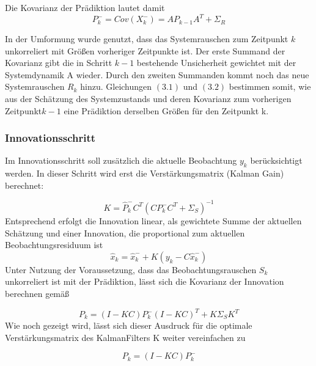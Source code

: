 Die Kovarianz der Prädiktion lautet damit
\begin{equation}
\tag{3.2}
{P}_{k}^{-}=Cov({X}_{k}^{-})=AP_{k-1}A^{T}+\Sigma_{R}
\end{equation}

In der Umformung wurde genutzt, dass das Systemrauschen zum Zeitpunkt $k$ unkorreliert mit
Größen vorheriger Zeitpunkte ist. Der erste Summand der Kovarianz gibt die in Schritt $k-1$ bestehende
Unsicherheit gewichtet mit der Systemdynamik A wieder. Durch den zweiten Summanden
kommt noch das neue Systemrauschen $R_{k}$ hinzu. Gleichungen $(3.1)$ und $(3.2)$ bestimmen somit, wie aus der Schätzung des Systemzustands und deren Kovarianz zum vorherigen Zeitpunkt$ k-1$ eine Prädiktion derselben Größen für den Zeitpunkt k.

\subsubsection{Innovationsschritt}
Im Innovationsschritt soll zusätzlich die aktuelle Beobachtung $y_{k}$ berücksichtigt werden. In dieser Schritt wird erst die Verstärkungsmatrix (Kalman Gain) berechnet:

\begin{equation}
\tag{3.3}
K=\widehat{P}_{k}^{-}C^{T}(CP_{k}^{-}C^{T}+\Sigma_{S})^{-1}
\end{equation}
Entsprechend erfolgt die Innovation linear, als gewichtete
Summe der aktuellen Schätzung und einer Innovation, die proportional zum aktuellen Beobachtungsresiduum ist
\begin{equation}
\tag{3.4}
\widehat{x}_{k}=\widehat{x}_{k}^{-}+K(y_{k}-C\widehat{x}_{k}^{-})
\end{equation}
Unter Nutzung der Voraussetzung, dass das Beobachtungsrauschen $S_{k}$ unkorreliert ist mit der Prädiktion, lässt sich die Kovarianz der Innovation berechnen gemäß

\begin{equation}
\tag{3.5}
P_{k}=(I-KC)P_{k}^{-}(I-KC)^{T}+K\Sigma_{S}K^{T}
\end{equation}
Wie noch gezeigt wird, lässt sich dieser Ausdruck für die optimale Verstärkungsmatrix des KalmanFilters K weiter vereinfachen zu

\begin{equation}
\tag{3.6}
P_{k}=(I-KC)P^{-}_{k}
\end{equation}


